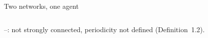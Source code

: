 \documentclass[10pt, aspectratio=169]{beamer}
\begin{document}
\begin{frame}[label=m-networks]{Two networks, one agent}
\begin{columns}[T]
\begin{uncoverenv}
{      \smallskip
      --: not strongly connected, periodicity not defined (Definition~1.2).\par}
      \end{uncoverenv}

\end{columns}
\end{frame}
\end{document}
